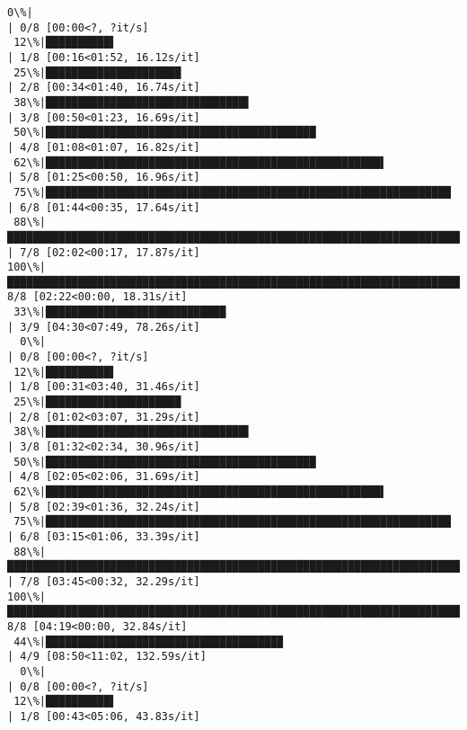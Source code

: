 \documentclass[11pt]{article}
\begin{document}
\begin{Verbatim}[commandchars=\\\{\}]
  0\%|                                                                                            | 0/8 [00:00<?, ?it/s]
 12\%|██████████▌                                                                         | 1/8 [00:16<01:52, 16.12s/it]
 25\%|█████████████████████                                                               | 2/8 [00:34<01:40, 16.74s/it]
 38\%|███████████████████████████████▌                                                    | 3/8 [00:50<01:23, 16.69s/it]
 50\%|██████████████████████████████████████████                                          | 4/8 [01:08<01:07, 16.82s/it]
 62\%|████████████████████████████████████████████████████▌                               | 5/8 [01:25<00:50, 16.96s/it]
 75\%|███████████████████████████████████████████████████████████████                     | 6/8 [01:44<00:35, 17.64s/it]
 88\%|█████████████████████████████████████████████████████████████████████████▌          | 7/8 [02:02<00:17, 17.87s/it]
100\%|████████████████████████████████████████████████████████████████████████████████████| 8/8 [02:22<00:00, 18.31s/it]
 33\%|████████████████████████████                                                        | 3/9 [04:30<07:49, 78.26s/it]
  0\%|                                                                                            | 0/8 [00:00<?, ?it/s]
 12\%|██████████▌                                                                         | 1/8 [00:31<03:40, 31.46s/it]
 25\%|█████████████████████                                                               | 2/8 [01:02<03:07, 31.29s/it]
 38\%|███████████████████████████████▌                                                    | 3/8 [01:32<02:34, 30.96s/it]
 50\%|██████████████████████████████████████████                                          | 4/8 [02:05<02:06, 31.69s/it]
 62\%|████████████████████████████████████████████████████▌                               | 5/8 [02:39<01:36, 32.24s/it]
 75\%|███████████████████████████████████████████████████████████████                     | 6/8 [03:15<01:06, 33.39s/it]
 88\%|█████████████████████████████████████████████████████████████████████████▌          | 7/8 [03:45<00:32, 32.29s/it]
100\%|████████████████████████████████████████████████████████████████████████████████████| 8/8 [04:19<00:00, 32.84s/it]
 44\%|████████████████████████████████████▉                                              | 4/9 [08:50<11:02, 132.59s/it]
  0\%|                                                                                            | 0/8 [00:00<?, ?it/s]
 12\%|██████████▌                                                                         | 1/8 [00:43<05:06, 43.83s/it]

\end{Verbatim}
\end{document}
